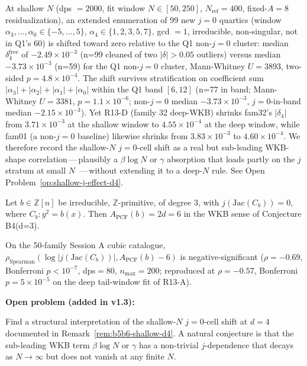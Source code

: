 \begin{remark}\label{rem:b5b6-shallow-d4}
At shallow $N$ (dps $=2000$, fit window $N\in[50,250]$,
$N_{\mathrm{ref}}=400$, fixed-$A=8$ residualization), an extended
enumeration of 99 new $j=0$ quartics (window $\alpha_3,\ldots,\alpha_0
\in\{-5,\ldots,5\}$, $\alpha_4\in\{1,2,3,5,7\}$, gcd $=1$,
irreducible, non-singular, not in Q1's 60) is shifted toward zero
relative to the Q1 non-$j=0$ cluster: median $\delta^{\mathrm{free}}_4$
of $-2.49\times 10^{-3}$ (n=99 cleaned of two $|\delta|>0.05$
outliers) versus median $-3.73\times 10^{-3}$ (n=59) for the Q1
non-$j=0$ cluster, Mann-Whitney $U=3893$, two-sided $p=4.8\times
10^{-4}$. The shift survives stratification on coefficient sum
$|\alpha_3|+|\alpha_2|+|\alpha_1|+|\alpha_0|$ within the Q1 band
$[6,12]$ (n=77 in band; Mann-Whitney $U=3381$, $p=1.1\times 10^{-6}$;
non-$j=0$ median $-3.73\times 10^{-3}$, $j=0$-in-band median
$-2.15\times 10^{-3}$).  Yet R13-D (family 32 deep-WKB) shrinks
fam32's $|\delta_4|$ from $3.71\times 10^{-3}$ at the shallow window
to $4.55\times 10^{-4}$ at the deep window, while fam01 (a
non-$j=0$ baseline) likewise shrinks from $3.83\times 10^{-3}$ to
$4.60\times 10^{-4}$.  We therefore record the shallow-$N$
$j=0$-cell shift as a real but sub-leading WKB-shape
correlation\,---\,plausibly a $\beta\log N$ or $\gamma$
absorption that loads partly on the $j$ stratum at small $N$
\,---\,without extending it to a deep-$N$ rule.  See
Open Problem~\ref{op:shallow-j-effect-d4}.
\end{remark}

\begin{conjecture}[B5, restricted, d=3 only]\label{conj:b5-d3}
Let $b\in\mathbb{Z}[n]$ be irreducible, $\mathbb{Z}$-primitive,
of degree $3$, with $j(\mathrm{Jac}(C_b))=0$, where
$C_b: y^2 = b(x)$.  Then $A_{\mathrm{PCF}}(b)=2d=6$ in the
WKB sense of Conjecture B4(d=3).
\end{conjecture}

\begin{conjecture}[B6, restricted, d=3 only]\label{conj:b6-d3}
On the 50-family Session A cubic catalogue,
$\rho_{\mathrm{Spearman}}(\log|j(\mathrm{Jac}(C_b))|,
A_{\mathrm{PCF}}(b)-6)$ is negative-significant
($\rho=-0.69$, Bonferroni $p<10^{-7}$, dps$=80$, $n_{\max}=200$;
reproduced at $\rho=-0.57$, Bonferroni $p=5\times 10^{-5}$ on
the deep tail-window fit of R13-A).
\end{conjecture}

\textbf{Open problem (added in v1.3):}
\begin{problem}\label{op:shallow-j-effect-d4}
Find a structural interpretation of the shallow-$N$ $j=0$-cell
shift at $d=4$ documented in Remark~\ref{rem:b5b6-shallow-d4}.
A natural conjecture is that the sub-leading WKB term
$\beta\log N$ or $\gamma$ has a non-trivial $j$-dependence that
decays as $N\to\infty$ but does not vanish at any finite $N$.
\end{problem}

